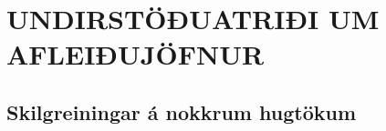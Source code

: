 \newenvironment{se}{\begin{setning+}\sl}{\hfill$\square$\end{setning+}\rm}
\newenvironment{sex}{\begin{setning+}\sl}{\hfill$\blacksquare$\end{setning+}\rm}
\newenvironment{sk}{\begin{skilgreining+}\rm}{\hfill$\square$\end{skilgreining+}\rm}
\newenvironment{sesk}{\begin{setningogskilgreining+}\rm}{\hfill$\square$\end{setningogskilgreining+}\rm}
\newenvironment{hs}{\begin{hjalparsetning+}\sl}{\hfill$\square$\end{hjalparsetning+}\rm}
\newenvironment{fs}{\begin{fylgisetning+}\sl}{\hfill$\square$\end{fylgisetning+}\rm}
\newenvironment{sy}{\begin{synidaemi+}\rm}{\hfill$\square$\end{synidaemi+}\rm}
\newenvironment{fo}{\begin{forrit+}\rm}{\hfill\end{forrit+}\rm}
\newenvironment{so}{\medbreak\noindent{\it Sönnun:}\rm}{\hfill$\blacksquare$\rm}
\newenvironment{sotx}[1]{\medbreak\noindent{\it #1:}\rm}{\hfill$\blacksquare$\rm}
\newcommand{\aefing}{\section{Æfingardæmi} \setcounter{daemateljari}{1}}
\newcommand{\daemi}{
{\medskip\noindent{\bf \thedaemateljari.}}
\addtocounter{daemateljari}{1}
}

\def\svar#1{\smallskip\noindent{\bf #1.} \ }
\def\lausn#1{\smallskip\noindent{\bf #1.} \ }
\def\ugrein#1{\medbreak\noindent{\bf #1.} }
\newcommand{\samantekt}{\noindent{\bf Samantekt.} }

\chapter
{UNDIRSTÖÐUATRIÐI UM AFLEIÐUJÖFNUR}




\section{Skilgreiningar á nokkrum hugtökum}

